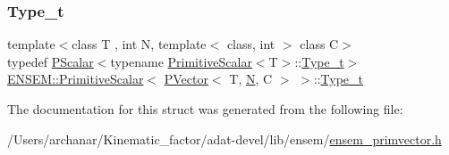 \mbox{\label{structENSEM_1_1PrimitiveScalar_3_01PVector_3_01T_00_01N_00_01C_01_4_01_4_afc0dde305bcae3b52f619989d06ed843}} 
\subsubsection{\texorpdfstring{Type\_t}{Type\_t}\hspace{0.1cm}{\footnotesize\ttfamily [3/3]}}
{\footnotesize\ttfamily template$<$class T , int N, template$<$ class, int $>$ class C$>$ \\
typedef \mbox{\hyperlink{classENSEM_1_1PScalar}{P\+Scalar}}$<$typename \mbox{\hyperlink{structENSEM_1_1PrimitiveScalar}{Primitive\+Scalar}}$<$T$>$\+::\mbox{\hyperlink{structENSEM_1_1PrimitiveScalar_3_01PVector_3_01T_00_01N_00_01C_01_4_01_4_afc0dde305bcae3b52f619989d06ed843}{Type\+\_\+t}}$>$ \mbox{\hyperlink{structENSEM_1_1PrimitiveScalar}{E\+N\+S\+E\+M\+::\+Primitive\+Scalar}}$<$ \mbox{\hyperlink{classENSEM_1_1PVector}{P\+Vector}}$<$ T, \mbox{\hyperlink{adat__devel_2lib_2hadron_2operator__name__util_8cc_a7722c8ecbb62d99aee7ce68b1752f337}{N}}, C $>$ $>$\+::\mbox{\hyperlink{structENSEM_1_1PrimitiveScalar_3_01PVector_3_01T_00_01N_00_01C_01_4_01_4_afc0dde305bcae3b52f619989d06ed843}{Type\+\_\+t}}}



The documentation for this struct was generated from the following file\+:\begin{DoxyCompactItemize}
\item 
/\+Users/archanar/\+Kinematic\+\_\+factor/adat-\/devel/lib/ensem/\mbox{\hyperlink{adat-devel_2lib_2ensem_2ensem__primvector_8h}{ensem\+\_\+primvector.\+h}}\end{DoxyCompactItemize}
